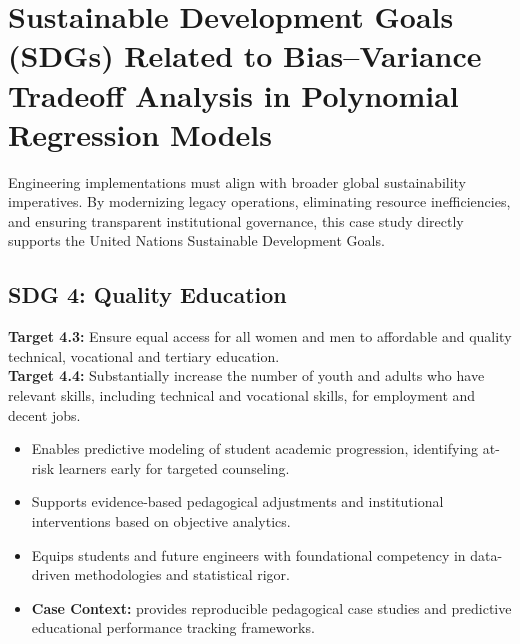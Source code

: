 \section{Sustainable Development Goals (SDGs) Related to Bias--Variance Tradeoff Analysis in Polynomial Regression Models}
Engineering implementations must align with broader global sustainability imperatives. By modernizing legacy operations, eliminating resource inefficiencies, and ensuring transparent institutional governance, this case study directly supports the United Nations Sustainable Development Goals.

\subsection{SDG 4: Quality Education}
\noindent\textbf{Target 4.3:} Ensure equal access for all women and men to affordable and quality technical, vocational and tertiary education. \\
\noindent\textbf{Target 4.4:} Substantially increase the number of youth and adults who have relevant skills, including technical and vocational skills, for employment and decent jobs.
\begin{itemize}
  \item Enables predictive modeling of student academic progression, identifying at-risk learners early for targeted counseling.
  \item Supports evidence-based pedagogical adjustments and institutional interventions based on objective analytics.
  \item Equips students and future engineers with foundational competency in data-driven methodologies and statistical rigor.
  \item \textbf{Case Context:} provides reproducible pedagogical case studies and predictive educational performance tracking frameworks.
\end{itemize}

